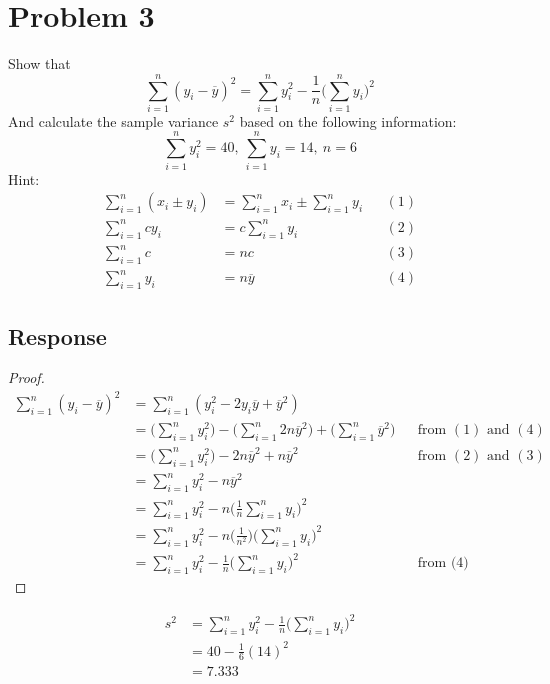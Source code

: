 \documentclass[13pt]{article}
\begin{document}
\newpage
\section*{Problem 3}
Show that
\[\sum_{i = 1}^{n} (y_i - \overline{y})^2 = \sum_{i = 1}^{n} y_i^2 - \frac{1}{n} \bigg(\sum_{i = 1}^{n} y_i\bigg)^2\]
And calculate the sample variance $s^2$ based on the following information:
\[\sum_{i = 1}^{n} y_i^2 = 40, \ \sum_{i = 1}^{n} y_i = 14, \ n = 6\]
Hint:
\begin{align*}
  \sum_{i = 1}^{n} (x_i \pm y_i) &= \sum_{i = 1}^{n} x_i \pm \sum_{i = 1}^{n} y_i && (1) \\
  \sum_{i = 1}^{n} cy_i &= c \sum_{i = 1}^{n} y_i && (2) \\
  \sum_{i = 1}^{n} c &= nc && (3) \\
  \sum_{i = 1}^{n} y_i &= n\overline{y} && (4)
\end{align*}
\subsection*{Response}
\begin{proof}
  \begin{align*}
    \sum_{i = 1}^{n} (y_i - \overline{y})^2 &= \sum_{i = 1}^{n} (y_i^2 - 2y_i\overline{y} + \overline{y}^2) \\
                                            &= \bigg(\sum_{i = 1}^{n} y_i^2\bigg) - \bigg(\sum_{i = 1}^{n}
                                              2n\overline{y}^2\bigg) + \bigg(\sum_{i = 1}^{n} \overline{y}^2\bigg) 
                                            && \text{from } (1) \text{ and } (4) \\
                                            &= \bigg(\sum_{i = 1}^{n} y_i^2\bigg) - 2n\overline{y}^2 + n\overline{y}^2 
                                            && \text{from } (2) \text{ and } (3)\\
                                            &= \sum_{i = 1}^{n} y_i^2 - n\overline{y}^2 \\
                                            &= \sum_{i = 1}^{n} y_i^2 - n\bigg(\frac{1}{n}
                                              \sum_{i = 1}^{n} y_i\bigg)^2 \\
                                            &= \sum_{i = 1}^{n} y_i^2 - n\bigg(\frac{1}{n^2}\bigg)\bigg(
                                              \sum_{i = 1}^{n} y_i\bigg)^2 \\
                                            &= \sum_{i = 1}^{n} y_i^2 - \frac{1}{n}\bigg(\sum_{i = 1}^{n} y_i\bigg)^2
                                            && \text{from (4)}
  \end{align*}
\end{proof}
\begin{align*}
  s^2 &= \sum_{i = 1}^{n} y_i^2 - \frac{1}{n} \bigg(\sum_{i = 1}^{n} y_i\bigg)^2 \\
      &= 40 - \frac{1}{6} (14)^2 \\
      &= 7.333
\end{align*}
\end{document}
